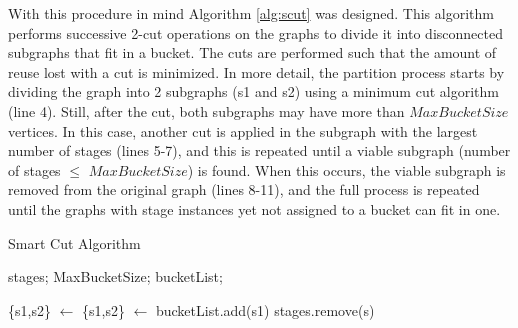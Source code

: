 

With this procedure in mind Algorithm \ref{alg:scut} was designed. 
This algorithm performs successive 2-cut operations on the graphs to divide it into
disconnected subgraphs that fit in a bucket. The cuts are performed such that
the amount of reuse lost with a cut is minimized. In more detail, the partition
process starts by dividing the graph into 2 subgraphs (s1 and s2) using a minimum cut
algorithm~\cite{mincut} (line 4). Still, after the cut, both
subgraphs may have more than $MaxBucketSize$ vertices. In this case, another
cut is applied in the subgraph with the largest number of stages (lines 5-7), and this is
repeated until a viable subgraph (number of stages $\leq$ $MaxBucketSize$) is
found.  When this occurs, the viable subgraph is removed from the original
graph (lines 8-11), and the full process is repeated until the graphs with stage instances
yet not assigned to a bucket can fit in one.

\begin{algorithm}[t!]
\small
	\caption{Smart Cut Algorithm
		\label{alg:scut}}
				
	\begin{algorithmic}[1]
		 stages; MaxBucketSize;
	 bucketList;
		
			\State \{s1,s2\} $\gets$ 
					\State \{s1,s2\} $\gets$ 
				\EndWhile
				\State bucketList.add(s1)
					\State stages.remove(s)
				\EndFor
		\EndWhile
	\end{algorithmic}
\end{algorithm}

